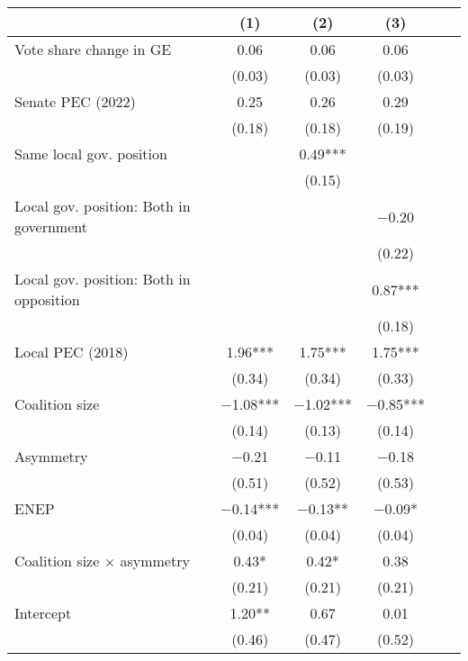 \begin{tabular}[t]{lccccc}
\toprule
  & (1) & (2) & (3) \\
\midrule
Vote share change in GE                 & \num{0.06}    & \num{0.06}    & \num{0.06}    \\
& (\num{0.03})   & (\num{0.03})   & (\num{0.03})   \\
Senate PEC (2022)                       & \num{0.25}     & \num{0.26}     & \num{0.29}     \\
& (\num{0.18})   & (\num{0.18})   & (\num{0.19})   \\
Same local gov. position                &                 & \num{0.49}***  &                 \\
&                 & (\num{0.15})   &                 \\
Local gov. position: Both in government &                 &                 & \num{-0.20}    \\
&                 &                 & (\num{0.22})   \\
Local gov. position: Both in opposition &                 &                 & \num{0.87}***  \\
&                 &                 & (\num{0.18})   \\
Local PEC (2018)                        & \num{1.96}***  & \num{1.75}***  & \num{1.75}***  \\
& (\num{0.34})   & (\num{0.34})   & (\num{0.33})   \\
Coalition size                          & \num{-1.08}*** & \num{-1.02}*** & \num{-0.85}*** \\
& (\num{0.14})   & (\num{0.13})   & (\num{0.14})   \\
Asymmetry                               & \num{-0.21}    & \num{-0.11}    & \num{-0.18}    \\
& (\num{0.51})   & (\num{0.52})   & (\num{0.53})   \\
ENEP                                    & \num{-0.14}*** & \num{-0.13}**  & \num{-0.09}*   \\
& (\num{0.04})   & (\num{0.04})   & (\num{0.04})   \\
Coalition size × asymmetry              & \num{0.43}*    & \num{0.42}*    & \num{0.38}    \\
& (\num{0.21})   & (\num{0.21})   & (\num{0.21})   \\
Intercept                             & \num{1.20}**   & \num{0.67}     & \num{0.01}     \\
& (\num{0.46})   & (\num{0.47})   & (\num{0.52})   \\

\end{tabular}
